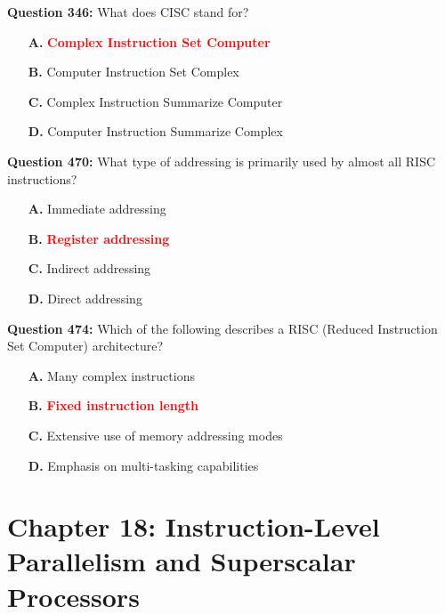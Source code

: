\documentclass[12pt,a4paper]{article}
\begin{document}
\vspace{0.5cm}

\textbf{Question 346:} What does CISC stand for?

\begin{itemize}
    \item[\textbf{A.}] \textcolor{red}{\textbf{Complex Instruction Set Computer}}
    \item[\textbf{B.}] Computer Instruction Set Complex
    \item[\textbf{C.}] Complex Instruction Summarize Computer
    \item[\textbf{D.}] Computer Instruction Summarize Complex
\end{itemize}

\vspace{0.5cm}

\textbf{Question 470:} What type of addressing is primarily used by almost all RISC instructions?

\begin{itemize}
    \item[\textbf{A.}] Immediate addressing
    \item[\textbf{B.}] \textcolor{red}{\textbf{Register addressing}}
    \item[\textbf{C.}] Indirect addressing
    \item[\textbf{D.}] Direct addressing
\end{itemize}

\vspace{0.5cm}

\textbf{Question 474:} Which of the following describes a RISC (Reduced Instruction Set Computer) architecture?

\begin{itemize}
    \item[\textbf{A.}] Many complex instructions
    \item[\textbf{B.}] \textcolor{red}{\textbf{Fixed instruction length}}
    \item[\textbf{C.}] Extensive use of memory addressing modes
    \item[\textbf{D.}] Emphasis on multi-tasking capabilities
\end{itemize}

\vspace{0.5cm}

\section{Chapter 18: Instruction-Level Parallelism and Superscalar Processors}
\end{document}
